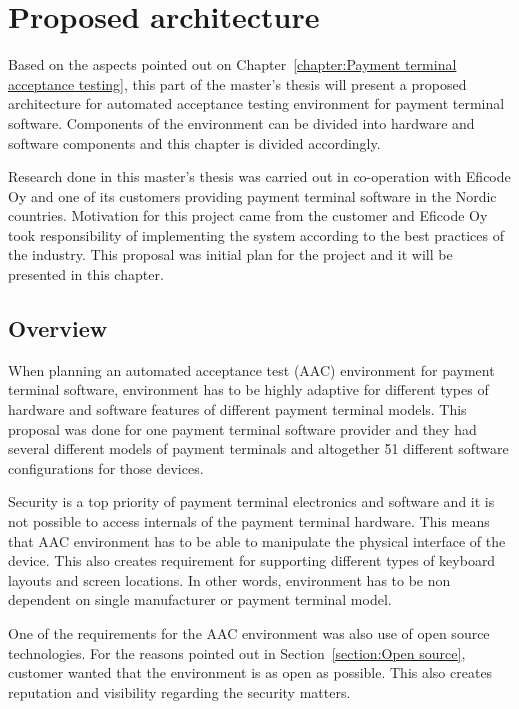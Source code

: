 
\chapter{Proposed architecture}
\label{chapter:Proposed architecture}

Based on the aspects pointed out on Chapter~\ref{chapter:Payment terminal acceptance testing}, this part of the master's thesis will present a proposed architecture for automated acceptance testing environment for payment terminal software. Components of the environment can be divided into hardware and software components and this chapter is divided accordingly.

Research done in this master's thesis was carried out in co-operation with Eficode Oy and one of its customers providing payment terminal software in the Nordic countries. Motivation for this project came from the customer and Eficode Oy took responsibility of implementing the system according to the best practices of the industry. This proposal was initial plan for the project and it will be presented in this chapter.

\section{Overview}

When planning an automated acceptance test (AAC) environment for payment terminal software, environment has to be highly adaptive for different types of hardware and software features of different payment terminal models. This proposal was done for one payment terminal software provider and they had several different models of payment terminals and altogether 51 different software configurations for those devices.

Security is a top priority of payment terminal electronics and software and it is not possible to access internals of the payment terminal hardware. This means that AAC environment has to be able to manipulate the physical interface of the device. This also creates requirement for supporting different types of keyboard layouts and screen locations. In other words, environment has to be non dependent on single manufacturer or payment terminal model.

One of the requirements for the AAC environment was also use of open source technologies. For the reasons pointed out in Section~\ref{section:Open source}, customer wanted that the environment is as open as possible. This also creates reputation and visibility regarding the security matters.

